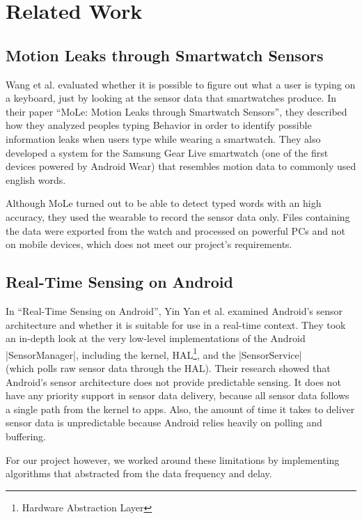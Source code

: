 \section{Related Work}
\label{sec:relatedwork}

\subsection{Motion Leaks through Smartwatch Sensors}
Wang et al. evaluated whether it is possible to figure out what a user is typing on a keyboard, just by looking at the sensor data that smartwatches produce.
In their paper ``MoLe: Motion Leaks through Smartwatch Sensors''\cite{paper:motionleaks}, they described how they analyzed peoples typing Behavior in order to identify possible information leaks when users type while wearing a smartwatch.
They also developed a system for the Samsung Gear Live smartwatch (one of the first devices powered by Android Wear) that resembles motion data to commonly used english words.

Although MoLe turned out to be able to detect typed words with an high accuracy, they used the wearable to record the sensor data only.
Files containing the data were exported from the watch and processed on powerful PCs and not on mobile devices, which does not meet our project's requirements.

\subsection{Real-Time Sensing on Android}
In ``Real-Time Sensing on Android''\cite{paper:realtimesensing}, Yin Yan et al. examined Android’s sensor architecture and whether it is suitable for use in a real-time context.
They took an in-depth look at the very low-level implementations of the Android |SensorManager|\cite{androiddocs:sensormanager}, including the kernel, HAL\footnote{Hardware Abstraction Layer}, and the |SensorService| \\(which polls raw sensor data through the HAL).
Their research showed that Android's sensor architecture does not provide predictable sensing.
It does not have any priority support in sensor data delivery, because all sensor data follows a single path from the kernel to apps.
Also, the amount of time it takes to deliver sensor data is unpredictable because Android relies heavily on polling and buffering.

For our project however, we worked around these limitations by implementing algorithms that abstracted from the data frequency and delay.

